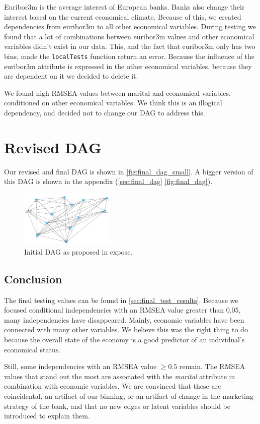 \documentclass[11pt]{article}
\begin{document}
\begin{multicols}{2}
\bigskip
Euribor3m is the average interest of European banks. Banks also change their
interest based on the current economical climate. Because of this, we created
dependencies from euribor3m to all other economical variables. During testing we
found that a lot of combinations between euribor3m values and other economical
variables didn't exist in our data. This, and the fact that euribor3m only
has two bins, made the \texttt{localTests} function return an error. Because the influence
of the euribor3m attribute is expressed in the other economical variables, because
they are dependent on it we decided to delete it.



We found high RMSEA values between marital and economical variables,
conditioned on other economical variables. We think this is an illogical
dependency, and decided not to change our DAG to address this.

\section{Revised DAG}
Our revised and final DAG is shown in \autoref{fig:final_dag_small}.  A bigger
version of this DAG is shown in the appendix (\autoref{sec:final_dag}
\autoref{fig:final_dag}). 

\begin{figure}[H]
	\centering
	\includegraphics[width=0.4\textwidth]{images/final_dag}
	\caption{Initial DAG as proposed in expose.}
	\label{fig:final_dag_small}
\end{figure}

\subsection{Conclusion}
The final testing values can be found in \autoref{sec:final_test_results}.
Because we focused conditional independencies with an RMSEA value greater than 0.05, many independencies have disappeared.
Mainly, economic variables have been connected with many other variables.
We believe this was the right thing to do because the overall state of the economy is a good predictor of an individual's economical status.

Still, some independencies with an RMSEA value $\ge 0.5$ remain.
The RMSEA values that stand out the most are associated with the \textit{marital} attribute in combination with economic variables.
We are convinced that these are coincidental, an artifact of our binning, or an artifact of change in the marketing strategy of the bank, and that no new edges or latent variables should be introduced to explain them.

\newpage
\end{multicols}
\appendix
\end{document}
